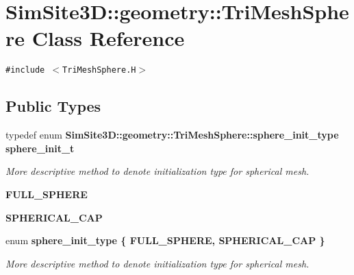 \section{SimSite3D::geometry::Tri\-Mesh\-Sphere Class Reference}
\label{classSimSite3D_1_1geometry_1_1TriMeshSphere}
{\tt \#include $<$Tri\-Mesh\-Sphere.H$>$}

\subsection*{Public Types}
\begin{CompactItemize}
\item 
typedef enum \bf{SimSite3D::geometry::Tri\-Mesh\-Sphere::sphere\_\-init\_\-type} \bf{sphere\_\-init\_\-t}\label{classSimSite3D_1_1geometry_1_1TriMeshSphere_adaa2f3ea546c14705877efaba422ac5}

\begin{CompactList}\small\item\em More descriptive method to denote initialization type for spherical mesh. \item\end{CompactList}\item 
\textbf{FULL\_\-SPHERE}\label{classSimSite3D_1_1geometry_1_1TriMeshSphere_1b7e3821daf89de36b78b79203a320545ca923ad9ce9681e6173252423882a51}

\item 
\textbf{SPHERICAL\_\-CAP}\label{classSimSite3D_1_1geometry_1_1TriMeshSphere_1b7e3821daf89de36b78b79203a3205441ddb124c602b61ac0a60de93ddc2f7d}

\item 
enum \bf{sphere\_\-init\_\-type} \{ \textbf{FULL\_\-SPHERE}, 
\textbf{SPHERICAL\_\-CAP}
 \}
\begin{CompactList}\small\item\em More descriptive method to denote initialization type for spherical mesh. \item\end{CompactList}\end{CompactItemize}
